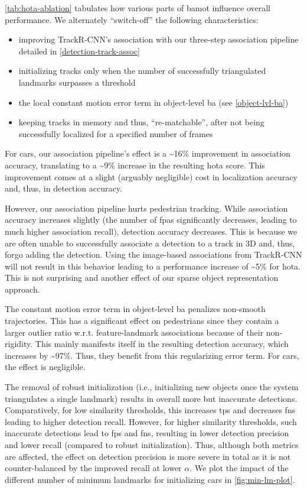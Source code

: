 \documentclass[headsepline, hidelinks, footsepline, footinclude=false, oneside, fontsize=11pt, paper=a4, listof=totoc, bibliography=totoc]{scrbook}
\begin{document}
\cref{tab:hota-ablation} tabulates how various parts of \gls{bamot} influence overall performance. 
We alternately ``switch-off'' the following characteristics:

\begin{itemize}
\item improving TrackR-CNN's association with our three-step association pipeline detailed in \cref{detection-track-assoc}
\item initializing tracks only when the number of successfully triangulated landmarks surpasses a threshold
\item the local constant motion error term in object-level \gls{ba} (see \cref{object-lvl-ba})
\item keeping tracks in memory and thus, ``re-matchable'', after not being successfully localized for a specified number of frames
\end{itemize}

For cars, our association pipeline's effect is a \textasciitilde{}16\% improvement in association accuracy, translating to a \textasciitilde{}9\% increase in the resulting \gls{hota} score. 
This improvement comes at a slight (arguably negligible) cost in localization accuracy and, thus, in detection accuracy. 

However, our association pipeline hurts pedestrian tracking. 
While association accuracy increases slightly (the number of \glspl{fpa} significantly decreases, leading to much higher association recall), detection accuracy decreases.
This is because we are often unable to successfully associate a detection to a track in 3D and, thus, forgo adding the detection.
Using the image-based associations from TrackR-CNN will not result in this behavior leading to a performance increase of \textasciitilde{}5\% for \gls{hota}.
This is not surprising and another effect of our sparse object representation approach.

The constant motion error term in object-level \gls{ba} penalizes non-smooth trajectories. 
This has a significant effect on pedestrians since they contain a larger outlier ratio w.r.t. feature-landmark associations because of their non-rigidity.
This mainly manifests itself in the resulting detection accuracy, which increases by \textasciitilde{}97\%.
Thus, they benefit from this regularizing error term. For cars, the effect is negligible.

The removal of robust initialization (i.e., initializing new objects once the system triangulates a single landmark) results in overall more but inaccurate detections.
Comparatively, for low similarity thresholds, this increases \glspl{tp} and decreases \glspl{fn} leading to higher detection recall. 
However, for higher similarity thresholds, such inaccurate detections lead to \glspl{fp} and \glspl{fn}, resulting in lower detection precision and lower recall (compared to robust initialization).
Thus, although both metrics are affected, the effect on detection precision is more severe in total as it is not counter-balanced by the improved recall at lower \(\alpha\).
We plot the impact of the different number of minimum landmarks for initializing cars in \cref{fig:min-lm-plot}.
\end{document}
